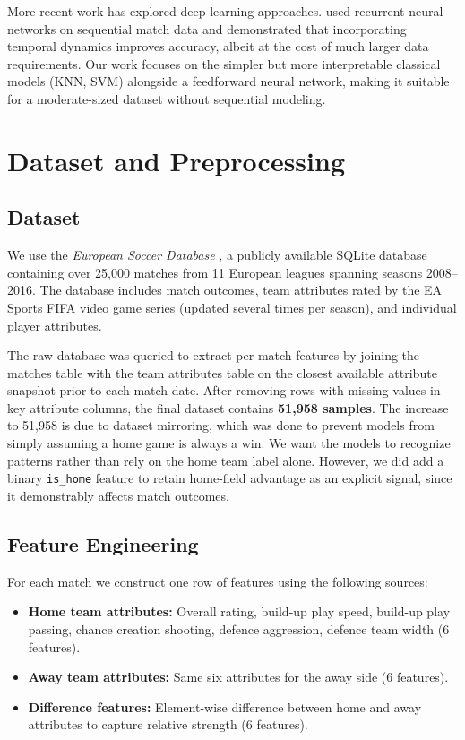 \documentclass[conference]{IEEEtran}
\begin{document}
More recent work has explored deep learning approaches. \cite{hubacek2019} used recurrent neural networks on sequential match data and demonstrated that incorporating temporal dynamics improves accuracy, albeit at the cost of much larger data requirements. Our work focuses on the simpler but more interpretable classical models (KNN, SVM) alongside a feedforward neural network, making it suitable for a moderate-sized dataset without sequential modeling.

\section{Dataset and Preprocessing}

\subsection{Dataset}

We use the \textit{European Soccer Database} \cite{kaggle_soccer}, a publicly available SQLite database containing over 25,000 matches from 11 European leagues spanning seasons 2008--2016. The database includes match outcomes, team attributes rated by the EA Sports FIFA video game series (updated several times per season), and individual player attributes.

The raw database was queried to extract per-match features by joining the matches table with the team attributes table on the closest available attribute snapshot prior to each match date. After removing rows with missing values in key attribute columns, the final dataset contains \textbf{51,958 samples}. The increase to 51,958 is due to dataset mirroring, which was done to prevent models from simply assuming a home game is always a win. We want the models to recognize patterns rather than rely on the home team label alone. However, we did add a binary \texttt{is\_home} feature to retain home-field advantage as an explicit signal, since it demonstrably affects match outcomes.

\subsection{Feature Engineering}

For each match we construct one row of features using the following sources:

\begin{itemize}
  \item \textbf{Home team attributes:} Overall rating, build-up play speed, build-up play passing, chance creation shooting, defence aggression, defence team width (6 features).
  \item \textbf{Away team attributes:} Same six attributes for the away side (6 features).
  \item \textbf{Difference features:} Element-wise difference between home and away attributes to capture relative strength (6 features).
\end{itemize}
\end{document}
